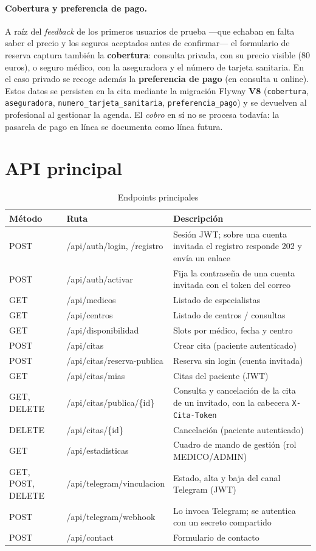\documentclass[12pt,a4paper]{report}
\begin{document}
\paragraph{Cobertura y preferencia de pago.} A raíz del \emph{feedback} de los primeros usuarios de prueba —que echaban en falta saber el precio y los seguros aceptados antes de confirmar— el formulario de reserva captura también la \textbf{cobertura}: consulta privada, con su precio visible (80 euros), o seguro médico, con la aseguradora y el número de tarjeta sanitaria. En el caso privado se recoge además la \textbf{preferencia de pago} (en consulta u online). Estos datos se persisten en la cita mediante la migración Flyway \textbf{V8} (\texttt{cobertura}, \texttt{aseguradora}, \texttt{numero\_tarjeta\_sanitaria}, \texttt{preferencia\_pago}) y se devuelven al profesional al gestionar la agenda. El \emph{cobro} en sí no se procesa todavía: la pasarela de pago en línea se documenta como línea futura.

\section{API principal}

\begin{table}[H]
\centering
\small
\begin{tabular}{llp{6.2cm}}
\toprule
\textbf{Método} & \textbf{Ruta} & \textbf{Descripción} \\
\midrule
POST & /api/auth/login, /registro & Sesión JWT; sobre una cuenta invitada el registro responde 202 y envía un enlace \\
POST & /api/auth/activar & Fija la contraseña de una cuenta invitada con el token del correo \\
GET & /api/medicos & Listado de especialistas \\
GET & /api/centros & Listado de centros / consultas \\
GET & /api/disponibilidad & Slots por médico, fecha y centro \\
POST & /api/citas & Crear cita (paciente autenticado) \\
POST & /api/citas/reserva-publica & Reserva sin login (cuenta invitada) \\
GET & /api/citas/mias & Citas del paciente (JWT) \\
GET, DELETE & /api/citas/publica/\{id\} & Consulta y cancelación de la cita de un invitado, con la cabecera \texttt{X-Cita-Token} \\
DELETE & /api/citas/\{id\} & Cancelación (paciente autenticado) \\
GET & /api/estadisticas & Cuadro de mando de gestión (rol MEDICO/ADMIN) \\
GET, POST, DELETE & /api/telegram/vinculacion & Estado, alta y baja del canal Telegram (JWT) \\
POST & /api/telegram/webhook & Lo invoca Telegram; se autentica con un secreto compartido \\
POST & /api/contact & Formulario de contacto \\
\bottomrule
\end{tabular}
\caption{Endpoints principales}
\end{table}
\end{document}
